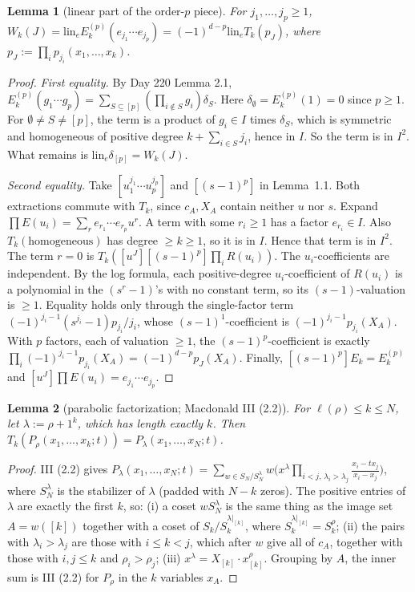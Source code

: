\documentclass[10pt]{article}
\newcommand{\lin}{\mathrm{lin}_e}
\newtheorem{lemma}{Lemma}[section]
\begin{document}
\begin{lemma}[linear part of the order-$p$ piece]
For $j_1,\dots,j_p\ge1$,
$W_k(J)=\lin E_k^{(p)}(e_{j_1}\cdots e_{j_p})=(-1)^{d-p}\lin T_k(p_J)$, where $p_J:=\prod_ip_{j_i}(x_1,\dots,x_k)$.
\end{lemma}
\begin{proof}
\emph{First equality.} By Day 220 Lemma 2.1, $E_k^{(p)}(g_1\cdots g_p)=\sum_{S\subseteq[p]}(\prod_{i\notin S}g_i)\delta_S$.
Here $\delta_\emptyset=E_k^{(p)}(1)=0$ since $p\ge1$. For $\emptyset\ne S\ne[p]$, the term is a product of $g_i\in I$
times $\delta_S$, which is symmetric and homogeneous of positive degree $k+\sum_{i\in S}j_i$, hence in $I$. So the term
is in $I^2$. What remains is $\lin\delta_{[p]}=W_k(J)$.

\emph{Second equality.} Take $[u_1^{j_1}\cdots u_p^{j_p}]$ and $[(s-1)^p]$ in Lemma~1.1. Both extractions commute with
$T_k$, since $c_A,X_A$ contain neither $u$ nor $s$. Expand $\prod E(u_i)=\sum_re_{r_1}\cdots e_{r_p}u^r$. A term with
some $r_i\ge1$ has a factor $e_{r_i}\in I$. Also $T_k(\text{homogeneous})$ has degree $\ge k\ge1$, so it is in $I$.
Hence that term is in $I^2$. The term $r=0$ is $T_k([u^J][(s-1)^p]\prod_iR(u_i))$. The $u_i$-coefficients are
independent. By the log formula, each positive-degree $u_i$-coefficient of $R(u_i)$ is a polynomial in the
$(s^r-1)$'s with no constant term, so its $(s-1)$-valuation is $\ge1$. Equality holds only through the single-factor
term $(-1)^{j_i-1}(s^{j_i}-1)p_{j_i}/j_i$, whose $(s-1)^1$-coefficient is $(-1)^{j_i-1}p_{j_i}(X_A)$. With $p$
factors, each of valuation $\ge1$, the $(s-1)^p$-coefficient is exactly
$\prod_i(-1)^{j_i-1}p_{j_i}(X_A)=(-1)^{d-p}p_J(X_A)$. Finally, $[(s-1)^p]E_k=E_k^{(p)}$ and
$[u^J]\prod E(u_i)=e_{j_1}\cdots e_{j_p}$.
\end{proof}

\begin{lemma}[parabolic factorization; Macdonald III (2.2)]
For $\ell(\rho)\le k\le N$, let $\lambda:=\rho+1^k$, which has length exactly $k$. Then $T_k(P_\rho(x_1,\dots,x_k;t))=P_\lambda(x_1,\dots,x_N;t)$.
\end{lemma}
\begin{proof}
III (2.2) gives $P_\lambda(x_1,\dots,x_N;t)=\sum_{w\in S_N/S_N^\lambda}w\bigl(x^\lambda\prod_{i<j,\,\lambda_i>\lambda_j}\frac{x_i-tx_j}{x_i-x_j}\bigr)$,
where $S_N^\lambda$ is the stabilizer of $\lambda$ (padded with $N-k$ zeros). The positive entries of $\lambda$ are
exactly the first $k$, so:
(i) a coset $wS_N^\lambda$ is the same thing as the image set $A=w([k])$ together with a coset of
$S_k/S_k^{\lambda|_{[k]}}$, where $S_k^{\lambda|_{[k]}}=S_k^\rho$;
(ii) the pairs with $\lambda_i>\lambda_j$ are those with $i\le k<j$, which after $w$ give all of $c_A$, together with
those with $i,j\le k$ and $\rho_i>\rho_j$;
(iii) $x^\lambda=X_{[k]}\cdot x_{[k]}^\rho$.
Grouping by $A$, the inner sum is III (2.2) for $P_\rho$ in the $k$ variables $x_A$.
\end{proof}
\end{document}
